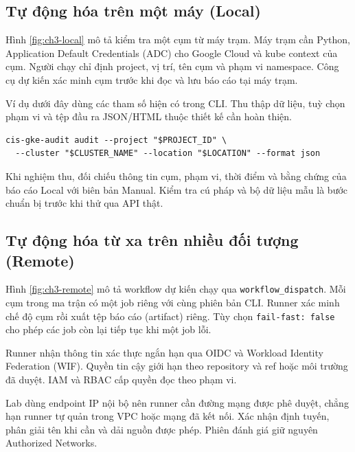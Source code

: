 \subsection{Tự động hóa trên một máy (Local)}

Hình \ref{fig:ch3-local} mô tả kiểm tra một cụm từ máy trạm. Máy trạm cần Python, Application Default Credentials (ADC) cho Google Cloud và kube context của cụm. Người chạy chỉ định project, vị trí, tên cụm và phạm vi namespace. Công cụ dự kiến xác minh cụm trước khi đọc và lưu báo cáo tại máy trạm.


Ví dụ dưới đây dùng các tham số hiện có trong CLI. Thu thập dữ liệu, tuỳ chọn phạm vi và tệp đầu ra JSON/HTML thuộc thiết kế cần hoàn thiện.

{\chapterthreecodesettings
\begin{verbatim}
cis-gke-audit audit --project "$PROJECT_ID" \
  --cluster "$CLUSTER_NAME" --location "$LOCATION" --format json
\end{verbatim}
}

Khi nghiệm thu, đối chiếu thông tin cụm, phạm vi, thời điểm và bằng chứng của báo cáo Local với biên bản Manual. Kiểm tra cú pháp và bộ dữ liệu mẫu là bước chuẩn bị trước khi thử qua API thật.

\subsection{Tự động hóa từ xa trên nhiều đối tượng (Remote)}

Hình \ref{fig:ch3-remote} mô tả workflow dự kiến chạy qua \texttt{workflow\_dispatch}. Mỗi cụm trong ma trận có một job riêng với cùng phiên bản CLI. Runner xác minh chế độ cụm rồi xuất tệp báo cáo (artifact) riêng. Tùy chọn \texttt{fail-fast: false} cho phép các job còn lại tiếp tục khi một job lỗi.


Runner nhận thông tin xác thực ngắn hạn qua OIDC và Workload Identity Federation (WIF). Quyền tin cậy giới hạn theo repository và ref hoặc môi trường đã duyệt. IAM và RBAC cấp quyền đọc theo phạm vi.

Lab dùng endpoint IP nội bộ nên runner cần đường mạng được phê duyệt, chẳng hạn runner tự quản trong VPC hoặc mạng đã kết nối. Xác nhận định tuyến, phân giải tên khi cần và dải nguồn được phép. Phiên đánh giá giữ nguyên Authorized Networks.

